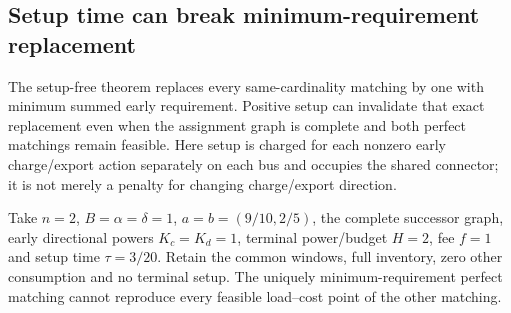 \subsection{Setup time can break minimum-requirement replacement}
\label{app:setupmatchingboundary}
The setup-free theorem replaces every same-cardinality matching by one
with minimum summed early requirement. Positive setup can invalidate
that exact replacement even when the assignment graph is complete and
both perfect matchings remain feasible. Here setup is charged for each
nonzero early charge/export action separately on each bus and occupies the shared
connector; it is not merely a penalty for changing charge/export direction.

\begin{proposition}
\label{prop:setupmatchingboundary}
Take $n=2$, $B=\alpha=\delta=1$, $a=b=(9/10,2/5)$,
the complete successor graph, early directional powers $K_c=K_d=1$,
terminal power/budget $H=2$, fee $f=1$ and setup time $\tau=3/20$.
Retain the common windows, full inventory, zero other consumption and
no terminal setup. The uniquely minimum-requirement perfect matching
cannot reproduce every feasible load--cost point of the other matching.
\end{proposition}

